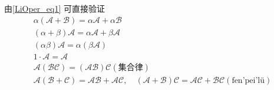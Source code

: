 由\autoref{LiOper_eq1} 可直接验证
\begin{equation}
\begin{aligned}
&\alpha(\mathcal{A+B})=\alpha\mathcal{A}+\alpha\mathcal{B}\\
&(\alpha+\beta)\mathcal{A}=\alpha\mathcal{A}+\beta\mathcal{A}\\
&(\alpha\beta)\mathcal{A}=\alpha(\beta\mathcal{A})\\
&1\cdot \mathcal{A}=\mathcal A\\
&\mathcal{A(BC)}=\mathcal{(AB)C}(\text{集合律})\\
&\mathcal{A(B+C)}=\mathcal{AB+AC},\quad \mathcal{(A+B)C}=\mathcal{AC+BC}(\text{fen'pei'lü})
&
\end{aligned}
\end{equation}



